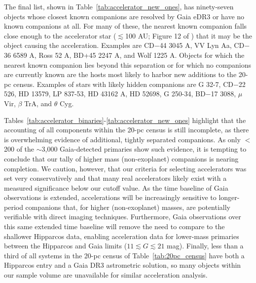 \documentclass[twocolumn,tighten,twocolappendix]{aastex631}
\begin{document}
The final list, shown in Table~\ref{tab:accelerator_new_ones}, has ninety-seven objects whose closest known companions are resolved by Gaia eDR3 or have no known companions at all. For many of these, the nearest known companion falls close enough to the accelerator star ($\lesssim$100 AU; Figure 12 of \citealt{kervella2022}) that it may be the object causing the acceleration. Examples are CD$-$44 3045 A,  VV Lyn Aa, CD$-$36 6589 A, Ross 52 A, BD+45 2247 A, and Wolf 1225 A. Objects for which the nearest known companion lies beyond this separation or for which no companions are currently known are the hosts most likely to harbor new additions to the 20-pc census. Examples of stars with likely hidden companions are G 32-7, CD$-$22 526, HD 13579, LP 837-53, HD 43162 A, HD 52698, G 250-34, BD$-$17 3088, $\mu$ Vir, $\beta$ TrA, and $\theta$ Cyg.

Tables~\ref{tab:accelerator_binaries}-\ref{tab:accelerator_new_ones} highlight that the accounting of all components within the 20-pc census is still incomplete, as there is overwhelming evidence of additional, tightly separated companions. As only $<$200 of the $\sim$3,000 Gaia-detected primaries show such evidence, it is tempting to conclude that our tally of higher mass (non-exoplanet) companions is nearing completion. We caution, however, that our criteria for selecting accelerators was set very conservatively and that many real accelerators likely exist with a measured significance below our cutoff value. As the time baseline of Gaia observations is extended, accelerations will be increasingly sensitive to longer-period companions that, for higher (non-exoplanet) masses, are potentially verifiable with direct imaging techniques. Furthermore, Gaia observations over this same extended time baseline will remove the need to compare to the shallower Hipparcos data, enabling acceleration data for lower-mass primaries between the Hipparcos and Gaia limits ($11 \lesssim G \lesssim 21$ mag). Finally, less than a third of all systems in the 20-pc census of Table~\ref{tab:20pc_census} have both a Hipparcos entry and a Gaia DR3 astrometric solution, so many objects within our sample volume are unavailable for similar acceleration analysis.
\end{document}
